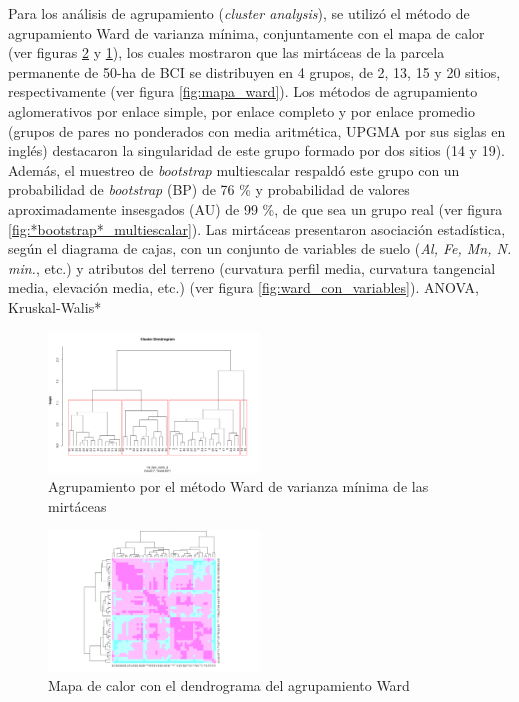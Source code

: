 \documentclass[11pt,]{article}
\begin{document}
Para los análisis de agrupamiento (\emph{cluster analysis}), se utilizó
el método de agrupamiento Ward de varianza mínima, conjuntamente con el
mapa de calor (ver figuras \ref{fig:mapadecalor_ward} y
\ref{fig:ward_fraccionado}), los cuales mostraron que las mirtáceas de
la parcela permanente de 50-ha de BCI se distribuyen en 4 grupos, de 2,
13, 15 y 20 sitios, respectivamente (ver figura \ref{fig:mapa_ward}).
Los métodos de agrupamiento aglomerativos por enlace simple, por enlace
completo y por enlace promedio (grupos de pares no ponderados con media
aritmética, UPGMA por sus siglas en inglés) destacaron la singularidad
de este grupo formado por dos sitios (14 y 19). Además, el muestreo de
\emph{bootstrap} multiescalar respaldó este grupo con un probabilidad de
\emph{bootstrap} (BP) de 76 \% y probabilidad de valores aproximadamente
insesgados (AU) de 99 \%, de que sea un grupo real (ver figura
\ref {fig:*bootstrap*_multiescalar}). Las mirtáceas presentaron
asociación estadística, según el diagrama de cajas, con un conjunto de
variables de suelo (\emph{Al, Fe, Mn, N. min.}, etc.) y atributos del
terreno (curvatura perfil media, curvatura tangencial media, elevación
media, etc.) (ver figura \ref{fig:ward_con_variables}). ANOVA,
Kruskal-Walis*

\begin{figure}
\centering
\includegraphics[width=0.50000\textwidth]{ward_fracionado.png}
\caption{Agrupamiento por el método Ward de varianza mínima de las
mirtáceas \label{fig:ward_fraccionado}}
\end{figure}

\begin{figure}
\centering
\includegraphics[width=0.50000\textwidth]{Mapadecalor_Ward_aa2.png}
\caption{Mapa de calor con el dendrograma del agrupamiento Ward
\label{fig:mapadecalor_ward}}
\end{figure}
\end{document}
